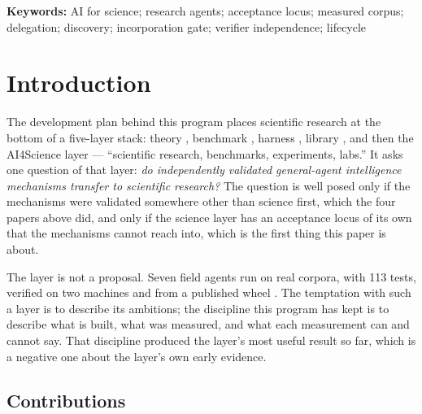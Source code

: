 \documentclass[11pt]{article}
\theoremstyle{definition}
\begin{document}
\noindent\textbf{Keywords:} AI for science; research agents; acceptance locus; measured corpus; delegation; discovery; incorporation gate; verifier independence; lifecycle

\tableofcontents
\bigskip

\section{Introduction}\label{sec:intro}

The development plan behind this program places scientific research at the bottom of a five-layer stack: theory \citep{yang2026unified}, benchmark \citep{yang2026hilbenchpaper}, harness \citep{yang2026harness}, library \citep{yang2026library}, and then the AI4Science layer --- ``scientific research, benchmarks, experiments, labs.'' It asks one question of that layer: \emph{do independently validated general-agent intelligence mechanisms transfer to scientific research?} The question is well posed only if the mechanisms were validated somewhere other than science first, which the four papers above did, and only if the science layer has an acceptance locus of its own that the mechanisms cannot reach into, which is the first thing this paper is about.

The layer is not a proposal. Seven field agents run on real corpora, with 113 tests, verified on two machines and from a published wheel \citep{ai4science_research_agents}. The temptation with such a layer is to describe its ambitions; the discipline this program has kept is to describe what is built, what was measured, and what each measurement can and cannot say. That discipline produced the layer's most useful result so far, which is a negative one about the layer's own early evidence.

\subsection{Contributions}
\end{document}

